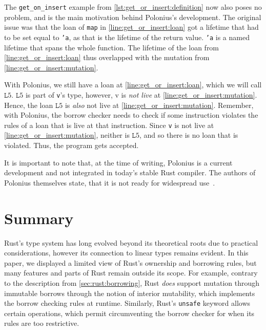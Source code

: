 \documentclass[sigplan,11pt,screen,nonacm]{acmart}
\begin{document}
The \texttt{get_on_insert} example from \cref{lst:get_or_insert:definition} now also poses no problem, and is the main motivation behind Polonius's development. The original issue was that the loan of \texttt{map} in \cref*{line:get_or_insert:loan} got a lifetime that had to be set equal to \texttt{'a}, as that is the lifetime of the return value. \texttt{'a} is a named lifetime that spans the whole function. The lifetime of the loan from \cref*{line:get_or_insert:loan} thus overlapped with the mutation from \cref*{line:get_or_insert:mutation}.

With Polonius, we still have a loan at \cref*{line:get_or_insert:loan}, which we will call \(\texttt{L}5\). \(\texttt{L}5\) is part of \texttt{v}'s type, however, v is \emph{not live} at \cref*{line:get_or_insert:mutation}. Hence, the loan \(\texttt{L}5\) is \emph{also} not live at \cref*{line:get_or_insert:mutation}. Remember, with Polonius, the borrow checker needs to check if some instruction violates the rules of a loan that is live at that instruction. Since \texttt{v} is not live at \cref*{line:get_or_insert:mutation}, neither is \(\texttt{L}5\), and so there is no loan that is violated. Thus, the program gets accepted.

It is important to note that, at the time of writing, Polonius is a current development and not integrated in today's stable Rust compiler. The authors of Polonius themselves state, that it is not ready for widespread use~\cite{rust:polonius-book}.


\section{Summary}

Rust's type system has long evolved beyond its theoretical roots due to practical considerations, however its connection to linear types remains evident. In this paper, we displayed a limited view of Rust's ownership and borrowing rules, but many features and parts of Rust remain outside its scope. For example, contrary to the description from \cref{sec:rust:borrowing}, Rust \emph{does} support mutation through immutable borrows through the notion of interior mutability, which implements the borrow checking rules at runtime. Similarly, Rust's \texttt{unsafe} keyword allows certain operations, which permit circumventing the borrow checker for when its rules are too restrictive.
\end{document}
